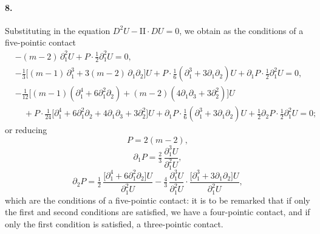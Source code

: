 \documentclass[11pt]{article}
\begin{document}
\paragraph{8.}
Substituting   in  the  equation  $D^2 U - \mathrm{II} \cdot DU = 0$,  we   obtain   as   the   conditions  of
a  five-pointic  contact
\begin{align*}
&-(m-2)\, \partial_1^2 U + P \cdot \tfrac{1}{2}\partial_1^2 U = 0, \\
&-\tfrac{1}{3}\bigl[(m-1)\, \partial_1^3 + 3(m-2)\, \partial_1 \partial_2\bigr] U
   + P \cdot \tfrac{1}{6}(\partial_1^3 + 3\partial_1 \partial_2) U
   + \partial_1 P \cdot \tfrac{1}{2} \partial_1^2 U = 0, \\
&-\tfrac{1}{12}\bigl[(m-1)(\partial_1^4 + 6\partial_1^2 \partial_2) + (m-2)(4\partial_1 \partial_3 + 3\partial_2^2)\bigr] U \\
&\quad + P \cdot \tfrac{1}{24}\bigl[\partial_1^4 + 6\partial_1^2 \partial_2 + 4\partial_1 \partial_3 + 3\partial_2^2\bigr] U
   + \partial_1 P \cdot \tfrac{1}{6}(\partial_1^3 + 3\partial_1 \partial_2) U
   + \tfrac{1}{2}\partial_2 P \cdot \tfrac{1}{2}\partial_1^2 U = 0;
\end{align*}
or  reducing
\[
P = 2(m-2),
\]
\[
\partial_1 P = \tfrac{2}{3}\, \frac{\partial_1^3 U}{\partial_1^2 U},
\]
\[
\partial_2 P = \tfrac{1}{2}\, \frac{\bigl[\partial_1^4 + 6\partial_1^2 \partial_2\bigr] U}{\partial_1^2 U}
              - \tfrac{4}{3}\, \frac{\partial_1^3 U}{\partial_1^2 U} \cdot \frac{\bigl[\partial_1^3 + 3\partial_1 \partial_2\bigr] U}{\partial_1^2 U},
\]
which  are  the  conditions  of  a  five-pointic  contact:  it  is  to  be  remarked  that  if  only
the  first  and  second  conditions  are  satisfied,  we  have  a  four-pointic  contact,  and  if  only
the  first  condition  is  satisfied,  a  three-pointic  contact.
\end{document}
